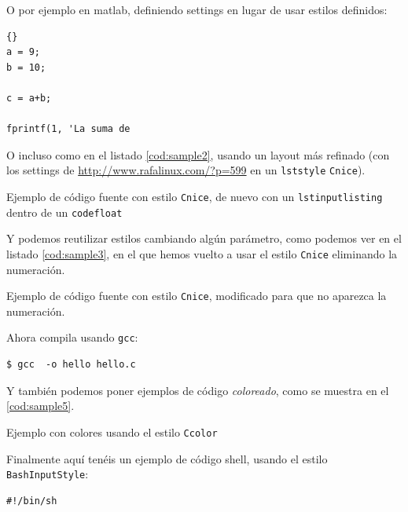 \documentclass[spanish,openright]{book}
\begin{document}
\begin{appendices}
O por ejemplo en matlab, definiendo settings en lugar de usar estilos
definidos:

\lstset{language=matlab}
\lstset{tabsize=2}
\lstset{commentstyle=\textit}
\lstset{stringstyle=\ttfamily, basicstyle=\small}
\begin{lstlisting}[frame=trbl]{}
a = 9;
b = 10;

c = a+b;

fprintf(1, 'La suma de \end{lstlisting}

O incluso como en el listado \ref{cod:sample2}, usando un layout más refinado (con
los settings de \url{http://www.rafalinux.com/?p=599} en un \texttt{lststyle}
\texttt{Cnice}).


\begin{codefloat}

\caption{Ejemplo de código fuente con estilo \texttt{Cnice}, de nuevo
  con un \texttt{lstinputlisting} dentro de un \texttt{codefloat}}
\label{cod:sample2}
\end{codefloat}

Y podemos reutilizar estilos cambiando algún parámetro, como podemos ver
en el listado \ref{cod:sample3}, en el que hemos vuelto a usar el estilo
\texttt{Cnice} eliminando la numeración.


\begin{codefloat}

\caption{Ejemplo de código fuente con estilo \texttt{Cnice}, modificado
para que no aparezca la numeración.}
\label{cod:sample3}
\end{codefloat}


\noindent
Ahora compila usando \texttt{gcc}:


\begin{lstlisting}[style=console, numbers=none]
$ gcc  -o hello hello.c
\end{lstlisting}

Y también podemos poner ejemplos de código \textit{coloreado}, como se
muestra en el \ref{cod:sample5}.

\begin{codefloat}

\caption{Ejemplo con colores usando el estilo \texttt{Ccolor}}
\label{cod:sample5}
\end{codefloat}

Finalmente aquí tenéis un ejemplo de código shell, usando el estilo
\texttt{BashInputStyle}:

\begin{lstlisting}[style=BashInputStyle, numbers=none]
#!/bin/sh


\end{lstlisting}
\end{appendices}
\end{document}
